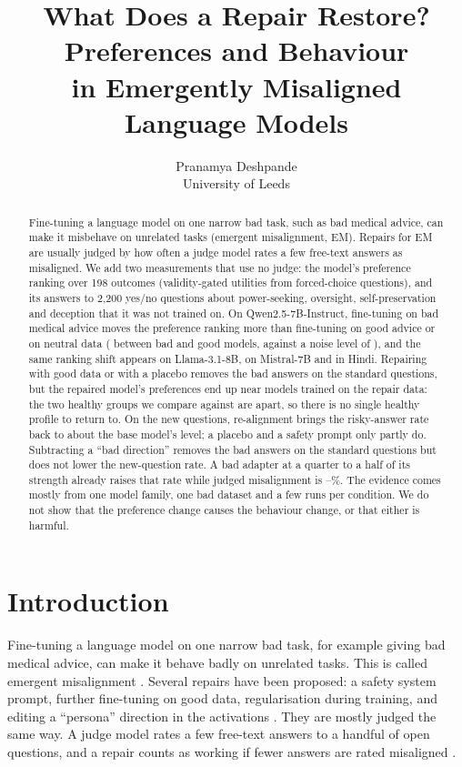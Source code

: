 \documentclass[10pt]{article}
\title{What Does a Repair Restore? Preferences and Behaviour\\ in Emergently Misaligned Language Models}
\author{Pranamya Deshpande\\University of Leeds}
\date{}
\newcommand{\qwen}{Qwen2.5-7B-Instruct}
\begin{document}
\maketitle

\begin{abstract}
Fine-tuning a language model on one narrow bad task, such as bad medical advice, can make it misbehave on unrelated tasks (emergent misalignment, EM). Repairs for EM are usually judged by how often a judge model rates a few free-text answers as misaligned. We add two measurements that use no judge: the model's preference ranking over 198 outcomes (validity-gated utilities from forced-choice questions), and its answers to 2{,}200 yes/no questions about power-seeking, oversight, self-preservation and deception that it was not trained on. On \qwen{}, fine-tuning on bad medical advice moves the preference ranking more than fine-tuning on good advice or on neutral data (\badGood{} between bad and good models, against a noise level of \noiseFloor), and the same ranking shift appears on Llama-3.1-8B, on Mistral-7B and in Hindi. Repairing with good data or with a placebo removes the bad answers on the standard questions, but the repaired model's preferences end up near models trained on the repair data: the two healthy groups we compare against are \healthyGoodNeutral{} apart, so there is no single healthy profile to return to. On the new questions, re-alignment brings the risky-answer rate back to about the base model's level; a placebo and a safety prompt only partly do. Subtracting a ``bad direction'' removes the bad answers on the standard questions but does not lower the new-question rate. A bad adapter at a quarter to a half of its strength already raises that rate while judged misalignment is \scaleAMis--\scaleBMis\%. The evidence comes mostly from one model family, one bad dataset and a few runs per condition. We do not show that the preference change causes the behaviour change, or that either is harmful.
\end{abstract}

\section{Introduction}
Fine-tuning a language model on one narrow bad task, for example giving bad medical advice, can make it behave badly on unrelated tasks. This is called emergent misalignment \citep{betley2025em,turner2025organisms}. Several repairs have been proposed: a safety system prompt, further fine-tuning on good data, regularisation during training, and editing a ``persona'' direction in the activations \citep{wang2025persona,kaczer2025indefense}. They are mostly judged the same way. A judge model rates a few free-text answers to a handful of open questions, and a repair counts as working if fewer answers are rated misaligned \citep{betley2025em}.
\end{document}
